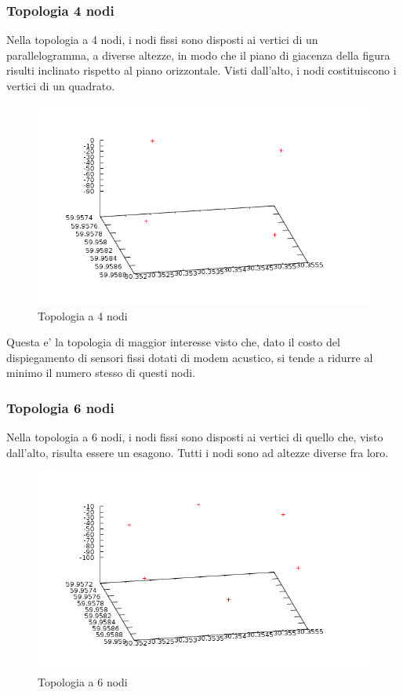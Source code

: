 \subsubsection{Topologia 4 nodi}
Nella topologia a 4 nodi, i nodi fissi sono disposti ai vertici di un parallelogramma, a diverse altezze, in modo che il piano di giacenza della figura risulti inclinato rispetto al piano orizzontale. Visti dall'alto, i nodi costituiscono i vertici di un quadrato.
\begin{figure}[H]
    \centering
    \includegraphics[width=\linewidth]{squaretopology.png}
    \caption{Topologia a 4 nodi}
    \label{fig:my_label}
\end{figure}
Questa e' la topologia di maggior interesse visto che, dato il costo del dispiegamento di sensori fissi dotati di modem acustico, si tende a ridurre al minimo il numero stesso di questi nodi.

\subsubsection{Topologia 6 nodi}
Nella topologia a 6 nodi, i nodi fissi sono disposti ai vertici di quello che, visto dall'alto, risulta essere un esagono. Tutti i nodi sono ad altezze diverse fra loro.   
\begin{figure}[H]
    \centering
    \includegraphics[width=\linewidth]{topologyhexagon.png}
    \caption{Topologia a 6 nodi}
    \label{fig:my_label}
\end{figure}
